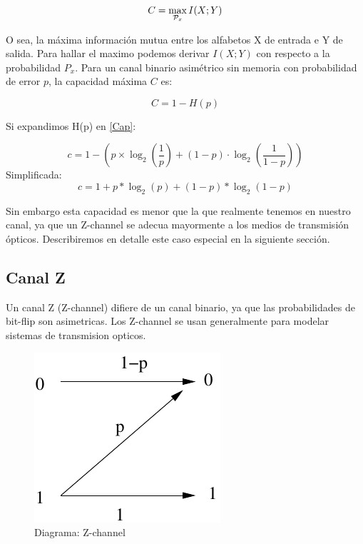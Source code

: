 \begin{equation}
C = \max_{{\cal{P}}_x} I(X;Y) 
\end{equation}

O sea, la máxima información mutua entre los alfabetos X de entrada e Y de salida.
Para hallar el maximo podemos derivar $I(X;Y)$ con respecto a la probabilidad $P_x$.
Para un canal binario asimétrico sin memoria con probabilidad de error $p$, la capacidad máxima $C$ es:

\begin{equation}\label{Cap}
C = 1 - H(p) 
\end{equation}

Si expandimos H(p) en \ref{Cap}:

$$ c = 1-\left(p \times \log_2\left(\frac{1}{p}\right) + (1-p) \cdot \log_2\left(\frac{1}{1-p}\right)\right) $$
Simplificada:
$$ c = 1 + p * \log_2(p) + (1 - p) * \log_2(1-p) $$

Sin embargo esta capacidad es menor que la que realmente tenemos en nuestro canal, ya que un Z-channel se adecua mayormente a los medios de transmisión ópticos. Describiremos en detalle este caso especial en la siguiente sección.

\subsection{Canal Z}
Un canal Z (Z-channel) difiere de un canal binario, ya que las probabilidades de bit-flip son asimetricas.
Los Z-channel se usan generalmente para modelar sistemas de transmision opticos.

\begin{figure}[th]
  \begin{center}
    \includegraphics[scale=0.5]{capacidad/zchannel}
  \end{center}
  \caption{Diagrama: Z-channel}
  \label{fig:Gal}
\end{figure}


